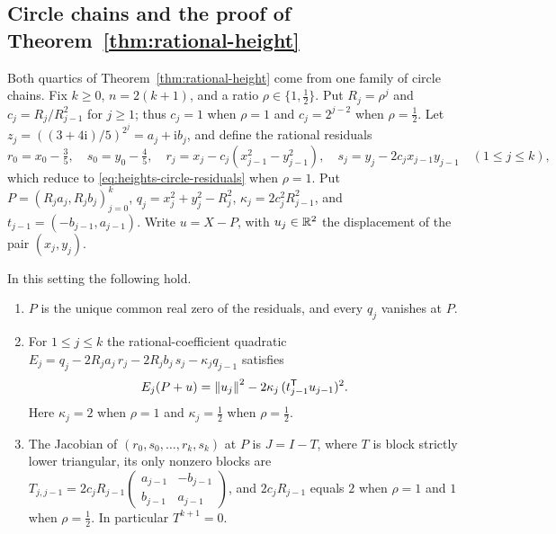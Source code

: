 \subsection{Circle chains and the proof of Theorem~\ref{thm:rational-height}}
\label{app:heights-circle}

Both quartics of Theorem~\ref{thm:rational-height} come from one family of
circle chains. Fix $k\ge0$, $n=2(k+1)$, and a ratio $\rho\in\{1,\frac12\}$.
Put $R_j=\rho^j$ and $c_j=R_j/R_{j-1}^2$ for $j\ge1$; thus $c_j=1$ when
$\rho=1$ and $c_j=2^{j-2}$ when $\rho=\frac12$. Let
$z_j=((3+4\mathrm i)/5)^{2^j}=a_j+\mathrm ib_j$, and define the rational
residuals
\begin{equation}
 r_0=x_0-\tfrac35,\quad s_0=y_0-\tfrac45,\quad
 r_j=x_j-c_j(x_{j-1}^2-y_{j-1}^2),\quad s_j=y_j-2c_jx_{j-1}y_{j-1}
 \quad(1\le j\le k),
 \label{eq:heights-scaled-residuals}
\end{equation}
which reduce to \eqref{eq:heights-circle-residuals} when $\rho=1$. Put
$P=(R_ja_j,R_jb_j)_{j=0}^k$, $q_j=x_j^2+y_j^2-R_j^2$,
$\kappa_j=2c_j^2R_{j-1}^2$, and $t_{j-1}=(-b_{j-1},a_{j-1})$. Write
$u=X-P$, with $u_j\in\mathbb R^2$ the displacement of the pair $(x_j,y_j)$.

\begin{lemma}
\label{lem:heights-circle-chain}
In this setting the following hold.
\begin{enumerate}[label=(\alph*)]
\item $P$ is the unique common real zero of the residuals, and every $q_j$
  vanishes at $P$.
\item For $1\le j\le k$ the rational-coefficient quadratic
  $E_j=q_j-2R_ja_j\,r_j-2R_jb_j\,s_j-\kappa_jq_{j-1}$ satisfies
  \[
   E_j(P+u)=\left\lVert u_j\right\rVert^2-2\kappa_j\,(t_{j-1}^{\mathsf T}u_{j-1})^2 .
  \]
  Here $\kappa_j=2$ when $\rho=1$ and $\kappa_j=\frac12$ when $\rho=\frac12$.
\item The Jacobian of $(r_0,s_0,\ldots,r_k,s_k)$ at $P$ is $J=I-T$, where $T$
  is block strictly lower triangular, its only nonzero blocks are
  $T_{j,j-1}=2c_jR_{j-1}\left(\begin{smallmatrix}a_{j-1}&-b_{j-1}\\
  b_{j-1}&a_{j-1}\end{smallmatrix}\right)$, and $2c_jR_{j-1}$ equals $2$ when
  $\rho=1$ and $1$ when $\rho=\frac12$. In particular $T^{k+1}=0$.
\end{enumerate}
\end{lemma}


